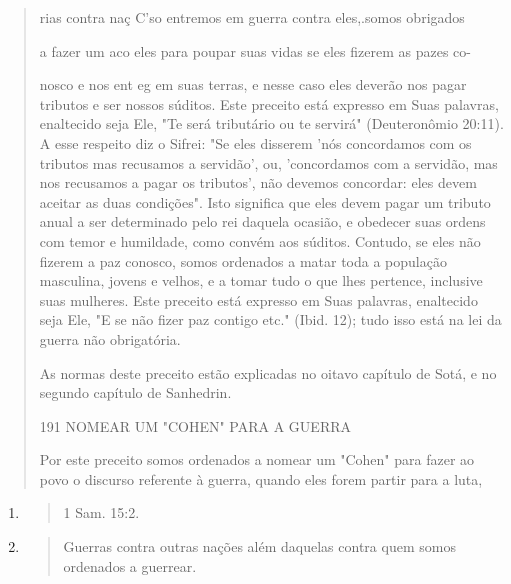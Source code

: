\begin{quote}
rias contra naç C'so entremos em guerra contra eles,.somos obrigados

a fazer um aco eles para poupar suas vidas se eles fizerem as pazes co-

nosco e nos ent eg em suas terras, e nesse caso eles deverão nos pagar
tribu­tos e ser nossos súditos. Este preceito está expresso em Suas
palavras, enalteci­do seja Ele, "Te será tributário ou te servirá"
(Deuteronômio 20:11). A esse res­peito diz o Sifrei: "Se eles disserem
'nós concordamos com os tributos mas re­cusamos a servidão', ou,
'concordamos com a servidão, mas nos recusamos a pagar os tributos', não
devemos concordar: eles devem aceitar as duas condi­ções". Isto
significa que eles devem pagar um tributo anual a ser determinado pelo
rei daquela ocasião, e obedecer suas ordens com temor e humildade, co­mo
convém aos súditos. Contudo, se eles não fizerem a paz conosco, somos
ordenados a matar toda a população masculina, jovens e velhos, e a tomar
tudo o que lhes pertence, inclusive suas mulheres. Este preceito está
expresso em Suas palavras, enaltecido seja Ele, "E se não fizer paz
contigo etc." (Ibid. 12); tudo isso está na lei da guerra não
obrigatória.

As normas deste preceito estão explicadas no oitavo capítulo de So­tá, e
no segundo capítulo de Sanhedrin.

191 NOMEAR UM "COHEN" PARA A GUERRA

Por este preceito somos ordenados a nomear um "Cohen" para fa­zer ao
povo o discurso referente à guerra, quando eles forem partir para a
luta,
\end{quote}

\begin{enumerate}
\def\labelenumi{\arabic{enumi}.}
\setcounter{enumi}{194}
\item
  \begin{quote}
  1 Sam. 15:2.
  \end{quote}
\item
  \begin{quote}
  Guerras contra outras nações além daquelas contra quem somos ordenados
  a guerrear.
  \end{quote}
\end{enumerate}

